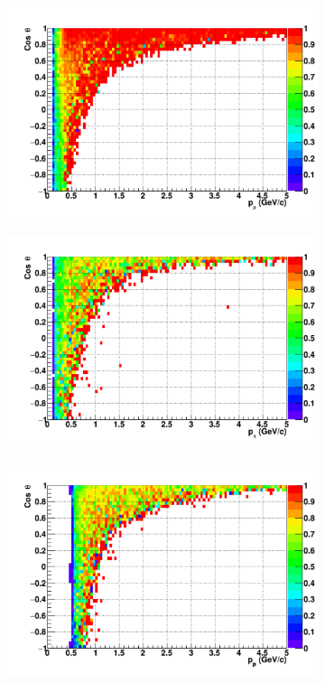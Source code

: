 \begin{figure}[htbp]
  \centering
    \begin{subfigure}{.49\textwidth}
    \includegraphics[width=\linewidth]{fig/Efficiency_Muon.pdf}
  \end{subfigure}
    \begin{subfigure}{.49\textwidth}
    \includegraphics[width=\linewidth]{fig/Efficiency_Pion.pdf}
  \end{subfigure}
    \begin{subfigure}{.49\textwidth}
    \includegraphics[width=\linewidth]{fig/Efficiency_Proton.pdf}

\end{subfigure}
\end{figure}
